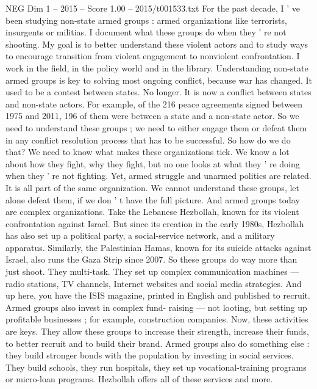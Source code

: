 \begin{textsample}{NEG Dim 1 – 2015 – Score 1.00 – 2015/t001533.txt}  \label{ex:f1_neg_042}
For the past decade, I ' ve been studying non-state armed groups : armed organizations like terrorists, insurgents or militias.
I document what these groups do when they ' re not shooting.
My goal is to better understand these violent actors and to study ways to encourage transition from violent engagement to nonviolent confrontation.
I work in the field, in the policy world and in the library.
Understanding non-state armed groups is key to solving most ongoing conflict, because war has changed.
It used to be a contest between states.
No longer.
It is now a conflict between states and non-state actors.
For example, of the 216 peace agreements signed between 1975 and 2011, 196 of them were between a state and a non-state actor.
So we need to understand these groups ; we need to either engage them or defeat them in any conflict resolution process that has to be successful.
So how do we do that?
We need to know what makes these organizations tick.
We know a lot about how they fight, why they fight, but no one looks at what they ' re doing when they ' re not fighting.
Yet, armed struggle and unarmed politics are related.
It is all part of the same organization.
We cannot understand these groups, let alone defeat them, if we don ' t have the full picture.
And armed groups today are complex organizations.
Take the Lebanese Hezbollah, known for its violent confrontation against Israel.
But since its creation in the early 1980s, Hezbollah has also set up a political party, a social-service network, and a military apparatus.
Similarly, the Palestinian Hamas, known for its suicide attacks against Israel, also runs the Gaza Strip since 2007.
So these groups do way more than just shoot.
They multi-task.
They set up complex communication machines — radio stations, TV channels, Internet websites and social media strategies.
And up here, you have the ISIS magazine, printed in English and published to recruit.
Armed groups also invest in complex fund- raising — not looting, but setting up profitable businesses ; for example, construction companies.
Now, these activities are keys.
They allow these groups to increase their strength, increase their funds, to better recruit and to build their brand.
Armed groups also do something else : they build stronger bonds with the population by investing in social services.
They build schools, they run hospitals, they set up vocational-training programs or micro-loan programs.
Hezbollah offers all of these services and more.

\end{textsample}
